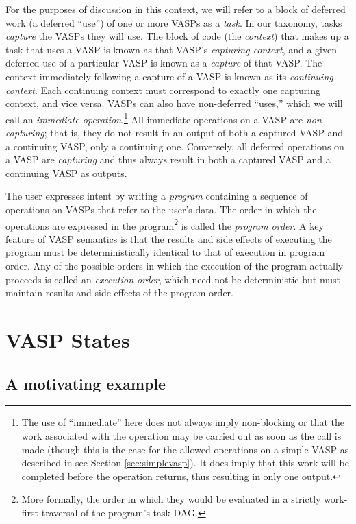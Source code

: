 For the purposes of discussion in this context, we will refer to a block of
deferred work (a deferred ``use'') of one or more VASPs as a {\it task}.
In our taxonomy, tasks {\it capture} the VASPs they will use. The block of code
(the {\it context}) that makes up a task that uses a VASP is known as that
VASP's {\it capturing context}, and a given deferred use of a particular VASP is
known as a {\it capture} of that VASP. The context immediately following a
capture of a VASP is known as its {\it continuing context}.  Each continuing
context must correspond to exactly one capturing context, and vice versa.  VASPs
can also have non-deferred ``uses,'' which we will call an {\it immediate
operation}.\footnote{The use of ``immediate'' here does not always imply
non-blocking or that the work associated with the operation may be carried out
as soon as the call is made (though this is the case for the allowed operations
on a simple VASP as described in see Section \ref{sec:simplevasp}).  It does
imply that this work will be completed before the operation returns, thus
resulting in only one output.} All immediate operations on a VASP are {\it
non-capturing}; that is, they do not result in an output of both a captured VASP
and a continuing VASP, only a continuing one.  Conversely, all deferred
operations on a VASP are {\it capturing} and thus always result in both a
captured VASP and a continuing VASP as outputs.  

The user expresses intent by writing a {\it program} containing a sequence of
operations on VASPs that refer to the user's data.  The order in which the
operations are expressed in the program\footnote{More formally, the order in
which they would be evaluated in a strictly work-first traversal of the
program's task DAG.} is called the {\it program order}.  A key feature of VASP
semantics is that the results and side effects of executing the program must be
deterministically identical to that of execution in program order.  Any of the
possible orders in which the execution of the program actually proceeds is
called an {\it execution order}, which need not be deterministic but must
maintain results and side effects of the program order.

\section{VASP States}

\subsection{A motivating example}

